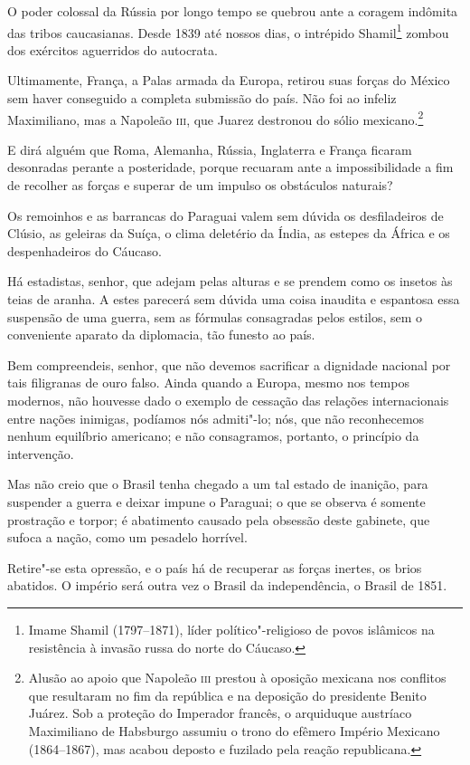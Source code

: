  O poder colossal da Rússia por longo tempo se quebrou ante a coragem
indômita das tribos caucasianas. Desde 1839 até nossos dias, o
intrépido Shamil\footnote{ Imame Shamil (1797--1871), líder político"-religioso de povos
islâmicos na resistência à invasão russa do norte do Cáucaso.}
 zombou dos exércitos aguerridos do autocrata. 

 Ultimamente, França, a Palas armada da Europa, retirou suas forças do
México sem haver conseguido a completa submissão do país. Não foi ao
infeliz Maximiliano, mas a Napoleão \textsc{iii}, que Juarez destronou do sólio
mexicano.\footnote{ Alusão ao apoio que Napoleão \textsc{iii} prestou à oposição mexicana nos conflitos que
resultaram no fim da república e na deposição do presidente Benito
Juárez. Sob a proteção do Imperador francês, o arquiduque austríaco
Maximiliano de Habsburgo assumiu o trono do efêmero Império Mexicano
(1864--1867), mas acabou deposto e fuzilado pela reação republicana.}


 E dirá alguém que Roma, Alemanha, Rússia, Inglaterra e França ficaram
desonradas perante a posteridade, porque recuaram ante a
impossibilidade a fim de recolher as forças e superar de um impulso os
obstáculos naturais?

 Os remoinhos e as barrancas do Paraguai valem sem dúvida os
desfiladeiros de Clúsio, as geleiras da Suíça, o clima deletério da
Índia, as estepes da África e os despenhadeiros do Cáucaso. 

 Há estadistas, senhor, que adejam pelas alturas e se prendem como os
insetos às teias de aranha. A estes parecerá sem dúvida uma coisa
inaudita e espantosa essa suspensão de uma guerra, sem as fórmulas
consagradas pelos estilos, sem o conveniente aparato da diplomacia, tão
funesto ao país. 

 Bem compreendeis, senhor, que não devemos sacrificar a dignidade
nacional por tais filigranas de ouro falso. Ainda quando a Europa,
mesmo nos tempos modernos, não houvesse dado o exemplo de cessação das
relações internacionais entre nações inimigas, podíamos nós
admiti"-lo; nós, que não reconhecemos nenhum equilíbrio americano; e
não consagramos, portanto, o princípio da intervenção. 

 Mas não creio que o Brasil tenha chegado a um tal estado de inanição,
para suspender a guerra e deixar impune o Paraguai; o que se observa é
somente prostração e torpor; é abatimento causado pela obsessão deste
gabinete, que sufoca a nação, como um pesadelo horrível.

 Retire"-se esta opressão, e o país há de recuperar as forças inertes,
os brios abatidos. O império será outra vez o Brasil da independência,
o Brasil de 1851. 

